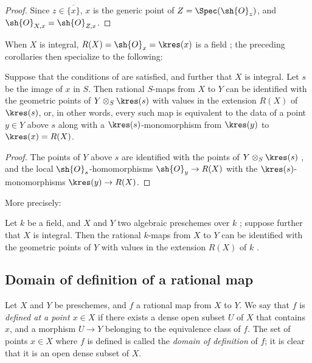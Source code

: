 \begin{proof}
Since $z\in\overline{\{x\}}$, $x$ is the generic point of $Z=\Spec(\sh{O}_z)$, and $\sh{O}_{X,x}=\sh{O}_{Z,x}$.
\end{proof}

When $X$ is integral, $R(X)=\sh{O}_x=\kres(x)$ is a field ; the preceding corollaries then specialize to the following:
\begin{corollary}[7.1.15]
\label{I.7.1.15}
Suppose that the conditions of  are satisfied, and further that $X$ is integral.
Let $s$ be the image of $x$ in $S$.
Then rational $S$-maps from $X$ to $Y$ can be identified with the geometric points of $Y\otimes_S\kres(s)$ with values in the extension $R(X)$ of $\kres(s)$, or, in other words, every such map is equivalent to the data of a point $y\in Y$ above $s$ along with a $\kres(s)$-monomorphism from $\kres(y)$ to $\kres(x)=R(X)$.
\end{corollary}

\begin{proof}
The points of $Y$ above $s$ are identified with the points of $Y\otimes_S\kres(s)$ , and the local $\sh{O}_s$-homomorphisms $\sh{O}_y\to R(X)$ with the $\kres(s)$-monomorphisms $\kres(y)\to R(X)$.
\end{proof}

More precisely:
\begin{corollary}[7.1.16]
\label{I.7.1.16}
Let $k$ be a field, and $X$ and $Y$ two algebraic preschemes over $k$ ; suppose further that $X$ is integral.
Then the rational $k$-maps from $X$ to $Y$ can be identified with the geometric points of $Y$ with values in the extension $R(X)$ of $k$ .
\end{corollary}

\subsection{Domain of definition of a rational map}
\label{subsection:I.7.2}

\begin{env}[7.2.1]
\label{I.7.2.1}
Let $X$ and $Y$ be preschemes, and $f$ a rational map from $X$ to $Y$.
We say that $f$ is \emph{defined at a point $x\in X$} if there exists a dense open subset $U$ of $X$ that contains $x$, and a morphism $U\to Y$ belonging to the equivalence class of $f$.
The set of points $x\in X$ where $f$ is defined is called the \emph{domain of definition} of $f$; it is clear that it is an open dense subset of $X$.
\end{env}


